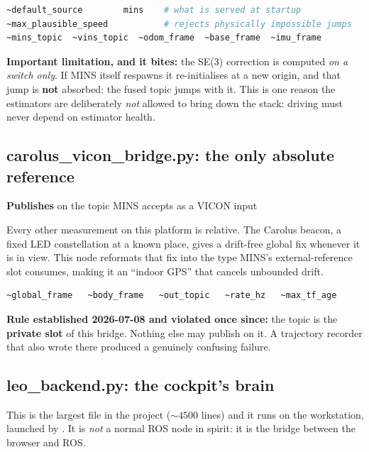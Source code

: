 \begin{lstlisting}[language=bash]
~default_source        mins    # what is served at startup
~max_plausible_speed           # rejects physically impossible jumps
~mins_topic  ~vins_topic  ~odom_frame  ~base_frame  ~imu_frame
\end{lstlisting}

\noindent \textbf{Important limitation, and it bites:} the SE(3) correction is
computed \emph{on a switch only}. If MINS itself respawns it re-initialises at
a new origin, and that jump is \textbf{not} absorbed: the fused topic jumps
with it. This is one reason the estimators are deliberately \emph{not} allowed
to bring down the stack: driving must never depend on estimator health.

\subsection{carolus\_vicon\_bridge.py: the only absolute reference}
\label{ap:repro-carolusbridge}
\textbf{Publishes}  on the topic MINS accepts
as a VICON input

Every other measurement on this platform is relative. The Carolus beacon, a
fixed LED constellation at a known place, gives a drift-free global fix
whenever it is in view. This node reformats that fix into the type MINS's
external-reference slot consumes, making it an ``indoor GPS'' that cancels
unbounded drift.

\begin{lstlisting}[language=bash]
~global_frame   ~body_frame   ~out_topic   ~rate_hz   ~max_tf_age
\end{lstlisting}

\noindent \textbf{Rule established 2026-07-08 and violated once since:} the
topic  is the \textbf{private slot} of this
bridge. Nothing else may publish on it. A trajectory recorder that also wrote
there produced a genuinely confusing failure.

\subsection{leo\_backend.py: the cockpit's brain}
\label{ap:repro-backend}
This is the largest file in the project ($\sim4500$ lines) and it runs on the
workstation, launched by . It is \emph{not} a
normal ROS node in spirit: it is the bridge between the browser and ROS.

